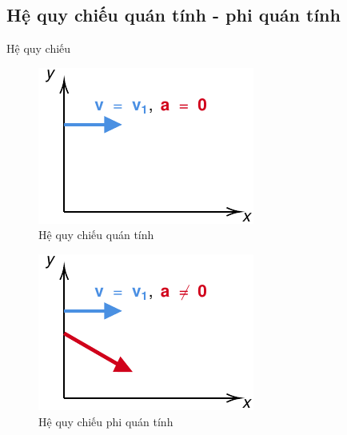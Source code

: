 \subsection{Hệ quy chiếu quán tính - phi quán tính}
\begin{frame}{Hệ quy chiếu}
    \begin{center}
        \begin{minipage}[t]{0.45\linewidth}
            \begin{figure}[!htb]
                \centering
                \includegraphics[width=0.9\linewidth]{Figures/FoR_1.pdf}
                \caption{Hệ quy chiếu quán tính}
                \label{fig:FoR_1}
            \end{figure}
        \end{minipage}
        \hspace{5mm}
        \begin{minipage}[t]{0.45\linewidth}            
            \begin{figure}[!htb]
                \centering
                \includegraphics[width=0.9\linewidth]{Figures/FoR_2.pdf}
                \caption{Hệ quy chiếu phi quán tính}
                \label{fig:FoR_2}
            \end{figure}
        \end{minipage}
    \end{center}
\end{frame}

